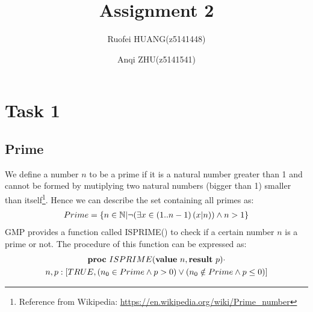 \documentclass[a4paper,12pt,fleqn]{scrartcl}
\title{Assignment 2}
\author{Ruofei HUANG(z5141448)\and
Anqi ZHU(z5141541)
}
\begin{document}
\maketitle
\section{Task 1}
\subsection{Prime }
We define a number $n$ to be a prime if it is a natural number greater than 1 and 
cannot be formed by mutiplying two natural numbers (bigger than 1) smaller than 
itself\footnote{
Reference from Wikipedia:
\url{https://en.wikipedia.org/wiki/Prime_number}}.
Hence we can describe the set containing all primes as:
\begin{gather*}
  Prime = \{ n\in \mathbb{N} | \neg (\exists x\in (1..n-1)\left(x|n\right)) \wedge n > 1 \}
\end{gather*} 
GMP provides a function called ISPRIME() to check if a certain number $n$ is a 
prime or not. The procedure of this function can be expressed as:
\begin{gather*}
  \text{\normalfont\bfseries proc} \ ISPRIME(\text{\normalfont\bfseries value} \ n, \text{\normalfont\bfseries result} \ p) \cdot \\
  n, p: [TRUE, (n_0 \in Prime \wedge p > 0) \vee (n_0 \notin Prime \wedge p \leq 0)]
\end{gather*}
\end{document}
